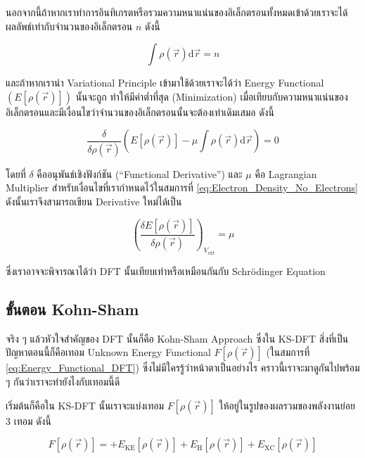 นอกจากนี้ถ้าหากเราทำการอินทิเกรตหรือรวมความหนาแน่นของอิเล็กตรอนทั้งหมดเข้าด้วยเราจะได้ผลลัพธ์เท่ากับจำนวนของอิเล็กตรอน $n$ ดังนี้

\begin{equation}
    \label{eq:Electron_Density_No_Electrons}
    \int \rho(\vec{r}) \mathrm{d} \vec{r} = n
\end{equation}

\noindent และถ้าหากเรานำ Variational Principle เข้ามาใช้ด้วยเราจะได้ว่า Energy Functional $(E[\rho(\vec{r})])$ นั้นจะถูก%
ทำให้มีค่าต่ำที่สุด (Minimization) เมื่อเทียบกับความหนาแน่นของอิเล็กตรอนและมีเงื่อนไขว่าจำนวนของอิเล็กตรอนนั้นจะต้องเท่าเดิมเสมอ ดังนี้

\begin{equation}
    \label{eq:Energy_Functional_Minized}
    \frac{\delta}{\delta \rho(\vec{r})}\left(E[\rho(\vec{r})] 
        - \mu \int \rho(\vec{r}) \mathrm{d} \vec{r}\right)
    = 0
\end{equation}

\noindent โดยที่ $\delta$ คืออนุพันธ์เชิงฟังก์ชัน (\enquote{Functional Derivative}) และ $\mu$ คือ Lagrangian Multiplier 
สำหรับเงื่อนไขที่เรากำหนดไว้ในสมการที่ \ref{eq:Electron_Density_No_Electrons} ดังนั้นเราจึงสามารถเขียน Derivative ใหม่ได้เป็น

\begin{equation}
    \left(\frac{\delta E[\rho(\vec{r})]}{\delta \rho(\vec{r})}\right)_{V_{\mathrm{ext}}} = \mu
\end{equation}

\noindent ซึ่งเราอาจจะพิจารณาได้ว่า DFT นั้นเทียบเท่าหรือเหมือนกันกับ Schr\"{o}dinger Equation 

\subsection{ขั้นตอน Kohn-Sham}

จริง ๆ แล้วหัวใจสำคัญของ DFT นั้นก็คือ Kohn-Sham Approach ซึ่งใน KS-DFT สิ่งที่เป็นปัญหาตอนนี้ก็คือเทอม Unknown Energy Functional 
$F[\rho(\vec{r})]$ (ในสมการที่ \ref{eq:Energy_Functional_DFT}) ซึ่งไม่มีใครรู้ว่าหน้าตาเป็นอย่างไร คราวนี้เราจะมาดูกันไปพร้อม ๆ 
กันว่าเราจะทำยังไงกับเทอมนี้ดี 

เริ่มต้นก็คือใน KS-DFT นั้นเราจะแบ่งเทอม $F[\rho(\vec{r})]$ ให้อยู่ในรูปของผลรวมของพลังงานย่อย 3 เทอม ดังนี้

\begin{equation}
    F[\rho(\vec{r})] 
    = 
    + E_{\text{KE}}[\rho(\vec{r})]
    + E_{\text{H}}[\rho(\vec{r})] 
    + E_{\text{XC}}[\rho(\vec{r})]
\end{equation}

